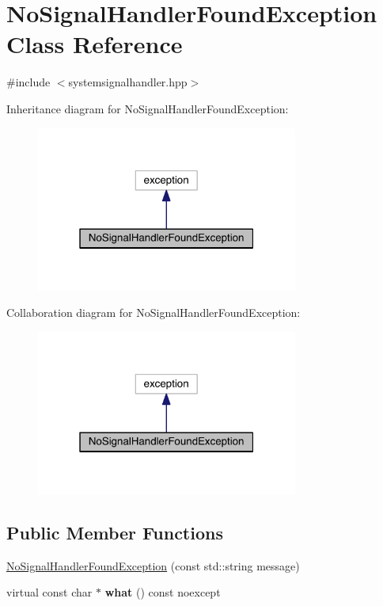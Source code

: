 \hypertarget{class_no_signal_handler_found_exception}{}\section{No\+Signal\+Handler\+Found\+Exception Class Reference}
\label{class_no_signal_handler_found_exception}


{\ttfamily \#include $<$systemsignalhandler.\+hpp$>$}



Inheritance diagram for No\+Signal\+Handler\+Found\+Exception\+:
\nopagebreak
\begin{figure}[H]
\begin{center}
\leavevmode
\includegraphics[width=244pt]{class_no_signal_handler_found_exception__inherit__graph}
\end{center}
\end{figure}


Collaboration diagram for No\+Signal\+Handler\+Found\+Exception\+:
\nopagebreak
\begin{figure}[H]
\begin{center}
\leavevmode
\includegraphics[width=244pt]{class_no_signal_handler_found_exception__coll__graph}
\end{center}
\end{figure}
\subsection*{Public Member Functions}
\begin{DoxyCompactItemize}
\item 
\hyperlink{class_no_signal_handler_found_exception_aedbbde0eab386ffcef936bb04da96862}{No\+Signal\+Handler\+Found\+Exception} (const std\+::string message)
\item 
\hypertarget{class_no_signal_handler_found_exception_a1d8b54d32f398d37b8e94212ec73029e}{}\label{class_no_signal_handler_found_exception_a1d8b54d32f398d37b8e94212ec73029e} 
virtual const char $\ast$ {\bfseries what} () const noexcept
\end{DoxyCompactItemize}


